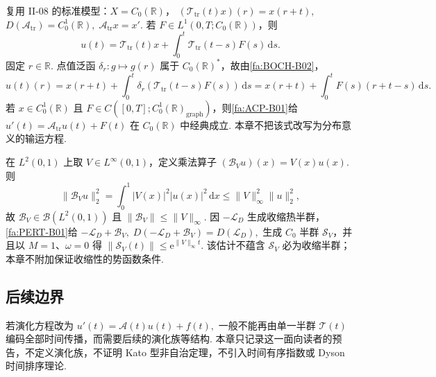 \begin{FAApplication}[受迫平移演化]
复用 II-08 的标准模型：\(\displaystyle X=C_0(\mathbb R)\)， \(\displaystyle (\mathcal T_{\mathrm{tr}}(t)x)(r)=x(r+t),\) \(\displaystyle D(\mathcal A_{\mathrm{tr}})=C_0^1(\mathbb R), \; \mathcal A_{\mathrm{tr}}x=x'.\)
若 \(\displaystyle F\in L^1(0,T;C_0(\mathbb R))\)，则
\[
u(t)
=
\mathcal T_{\mathrm{tr}}(t)x
+
\int_0^t\mathcal T_{\mathrm{tr}}(t-s)F(s)\,\mathrm{d}s.
\]
固定 \(\displaystyle r\in\mathbb R\). 点值泛函 \(\displaystyle\delta_r:g\mapsto g(r)\) 属于 \(\displaystyle C_0(\mathbb R)^*\)，故由\autoref{fa:BOCH-B02}，
\[
u(t)(r)=x(r+t)+\int_0^t\delta_r(\mathcal T_{\mathrm{tr}}(t-s)F(s))\,\mathrm{d}s=x(r+t)+\int_0^tF(s)(r+t-s)\,\mathrm{d}s.
\]
若 \(\displaystyle x\in C_0^1(\mathbb R)\) 且 \(\displaystyle F\in C([0,T];C_0^1(\mathbb R)_{\mathrm{graph}})\)，则\autoref{fa:ACP-B01}给 \(\displaystyle u'(t)=\mathcal A_{\mathrm{tr}}u(t)+F(t)\)
在 \(\displaystyle C_0(\mathbb R)\) 中经典成立. 本章不把该式改写为分布意义的输运方程.
\end{FAApplication}

\begin{FAApplication}[有界势扰动]
在 \(\displaystyle L^2(0,1)\) 上取 \(\displaystyle V\in L^\infty(0,1)\)，定义乘法算子 \(\displaystyle (\mathcal B_Vu)(x)=V(x)u(x).\)
则
\[
\|\mathcal B_Vu\|_2^2
=
\int_0^1|V(x)|^2|u(x)|^2\,\mathrm{d}x
\leqslant
\|V\|_\infty^2\|u\|_2^2,
\]
故 \(\displaystyle\mathcal B_V\in\mathcal B(L^2(0,1))\) 且 \(\displaystyle\|\mathcal B_V\|\leqslant\|V\|_\infty\). 因 \(\displaystyle-\mathcal L_D\) 生成收缩热半群，\autoref{fa:PERT-B01}给 \(\displaystyle -\mathcal L_D+\mathcal B_V, \; D(-\mathcal L_D+\mathcal B_V)=D(\mathcal L_D),\)
生成 \(\displaystyle C_0\) 半群 \(\displaystyle\mathcal S_V\)，并且以 \(\displaystyle M=1\)、\(\displaystyle\omega=0\) 得 \(\displaystyle \|\mathcal S_V(t)\|\leqslant\mathrm{e}^{\|V\|_\infty t}\). 该估计不蕴含 \(\displaystyle\mathcal S_V\) 必为收缩半群；本章不附加保证收缩性的势函数条件.
\end{FAApplication}

\subsection{后续边界}

\begin{FARemark}
若演化方程改为 \(\displaystyle u'(t)=\mathcal A(t)u(t)+f(t),\)
一般不能再由单一半群 \(\displaystyle\mathcal T(t)\) 编码全部时间传播，而需要后续的演化族等结构. 本章只记录这一面向读者的预告，不定义演化族，不证明 Kato 型非自治定理，不引入时间有序指数或 Dyson 时间排序理论.
\end{FARemark}

